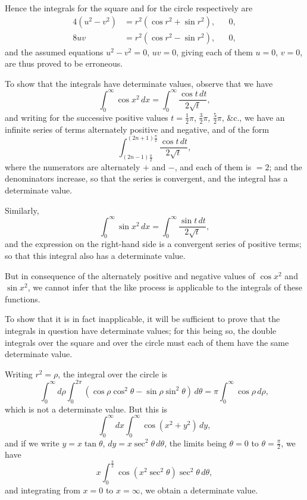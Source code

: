 \documentclass[11pt,a4paper]{book}
\begin{document}
Hence the integrals for the square and for the circle respectively are
\begin{align*}
4(u^2 - v^2) &= r^2(\cos r^2 + \sin r^2), & &0, \\
8uv &= r^2(\cos r^2 - \sin r^2), & &0,
\end{align*}
and the assumed equations $u^2 - v^2 = 0$, $uv = 0$, giving each of them $u = 0$, $v = 0$, are thus proved to be erroneous.

\newpage

To show that the integrals have determinate values, observe that we have
\[
\int_0^{\infty} \cos x^2\,dx = \int_0^{\infty} \frac{\cos t\,dt}{2\sqrt{t}},
\]
and writing for the successive positive values $t = \frac{1}{2}\pi$, $\frac{3}{2}\pi$, $\frac{5}{2}\pi$, \&c., we have an infinite series of terms alternately positive and negative, and of the form
\[
\int_{(2n-1)\frac{\pi}{2}}^{(2n+1)\frac{\pi}{2}} \frac{\cos t\,dt}{2\sqrt{t}},
\]
where the numerators are alternately $+$ and $-$, and each of them is $=2$; and the denominators increase, so that the series is convergent, and the integral has a determinate value.

Similarly,
\[
\int_0^{\infty} \sin x^2\,dx = \int_0^{\infty} \frac{\sin t\,dt}{2\sqrt{t}},
\]
and the expression on the right-hand side is a convergent series of positive terms; so that this integral also has a determinate value.

\newpage

But in consequence of the alternately positive and negative values of $\cos x^2$ and $\sin x^2$, we cannot infer that the like process is applicable to the integrals of these functions.

To show that it is in fact inapplicable, it will be sufficient to prove that the integrals in question have determinate values; for this being so, the double integrals over the square and over the circle must each of them have the same determinate value.

Writing $r^2 = \rho$, the integral over the circle is
\[
\int_0^{\infty} d\rho \int_0^{2\pi} (\cos \rho \cos^2 \theta - \sin \rho \sin^2 \theta)\,d\theta = \pi \int_0^{\infty} \cos \rho\,d\rho,
\]
which is not a determinate value. But this is
\[
\int_0^{\infty} dx \int_0^{\infty} \cos(x^2 + y^2)\,dy,
\]
and if we write $y = x \tan \theta$, $dy = x \sec^2 \theta\,d\theta$, the limits being $\theta = 0$ to $\theta = \frac{\pi}{2}$, we have
\[
x \int_0^{\frac{\pi}{2}} \cos(x^2 \sec^2 \theta) \sec^2 \theta\,d\theta,
\]
and integrating from $x = 0$ to $x = \infty$, we obtain a determinate value.
\end{document}
